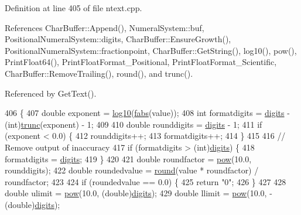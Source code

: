 Definition at line 405 of file ntext.\+cpp.



References Char\+Buffer\+::\+Append(), Numeral\+System\+::buf, Positional\+Numeral\+System\+::digits, Char\+Buffer\+::\+Ensure\+Growth(), Positional\+Numeral\+System\+::fractionpoint, Char\+Buffer\+::\+Get\+String(), log10(), pow(), Print\+Float64(), Print\+Float\+Format\+\_\+\+Positional, Print\+Float\+Format\+\_\+\+Scientific, Char\+Buffer\+::\+Remove\+Trailing(), round(), and trunc().



Referenced by Get\+Text().


\begin{DoxyCode}
406 \{
407     \textcolor{keywordtype}{double} exponent = \hyperlink{math_8h_a6572e82a4891917a9ba7fb2a964f8182}{log10}(\hyperlink{math_8h_a8fb5c0b9b43a108724b355136d29d2f9}{fabs}(value));
408     \textcolor{keywordtype}{int} formatdigits = \hyperlink{classPositionalNumeralSystem_a0a9e8e3f5d46e3c12dd3fc994ed2c1e6}{digits} - (int)\hyperlink{math_8h_a82a151adfde56b28fa8a50355c4f2ff6}{trunc}(exponent) - 1;
409 
410     \textcolor{keywordtype}{double} rounddigits = \hyperlink{classPositionalNumeralSystem_a0a9e8e3f5d46e3c12dd3fc994ed2c1e6}{digits} - 1;
411     \textcolor{keywordflow}{if} (exponent < 0.0) \{
412         rounddigits++;
413         formatdigits++;
414     \}
415 
416     \textcolor{comment}{// Remove output of inaccuracy}
417     \textcolor{keywordflow}{if} (formatdigits > (\textcolor{keywordtype}{int})\hyperlink{classPositionalNumeralSystem_a0a9e8e3f5d46e3c12dd3fc994ed2c1e6}{digits}) \{
418         formatdigits = \hyperlink{classPositionalNumeralSystem_a0a9e8e3f5d46e3c12dd3fc994ed2c1e6}{digits};
419     \}
420 
421     \textcolor{keywordtype}{double} roundfactor = \hyperlink{math_8h_aa56c9494c95edf68386375e97d64159b}{pow}(10.0, rounddigits);
422     \textcolor{keywordtype}{double} roundedvalue = \hyperlink{math_8h_a7df19cf730447c00150569250a4b5e1d}{round}(value * roundfactor) / roundfactor;
423 
424     \textcolor{keywordflow}{if} (roundedvalue == 0.0) \{
425         \textcolor{keywordflow}{return} \textcolor{stringliteral}{"0"};
426     \}
427 
428     \textcolor{keywordtype}{double} ulimit = \hyperlink{math_8h_aa56c9494c95edf68386375e97d64159b}{pow}(10.0, (\textcolor{keywordtype}{double})\hyperlink{classPositionalNumeralSystem_a0a9e8e3f5d46e3c12dd3fc994ed2c1e6}{digits});
429     \textcolor{keywordtype}{double} llimit = \hyperlink{math_8h_aa56c9494c95edf68386375e97d64159b}{pow}(10.0, -(\textcolor{keywordtype}{double})\hyperlink{classPositionalNumeralSystem_a0a9e8e3f5d46e3c12dd3fc994ed2c1e6}{digits});

\end{DoxyCode}

